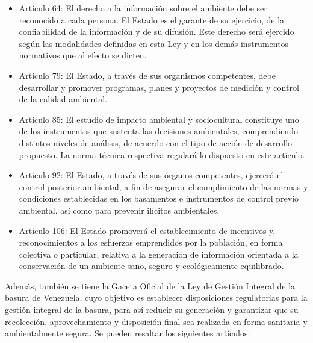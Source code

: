 \begin{itemize}
    \item Artículo 64: El derecho a la información sobre el ambiente debe ser reconocido a cada persona. El Estado es el garante de su ejercicio, de la confiabilidad de la información y de su difusión. Este derecho será ejercido según las modalidades definidas en esta Ley y en los demás instrumentos normativos que al efecto se dicten.
    
    \item Artículo 79: El Estado, a través de sus organismos competentes, debe desarrollar y promover programas, planes y proyectos de medición y control de la calidad ambiental.

    \item Artículo 85: El estudio de impacto ambiental y sociocultural constituye uno de los instrumentos que sustenta las decisiones ambientales, comprendiendo distintos niveles de análisis, de acuerdo con el tipo de acción de desarrollo propuesto. La norma técnica respectiva regulará lo dispuesto en este artículo.

    \item Artículo 92: El Estado, a través de sus órganos competentes, ejercerá el control posterior ambiental, a fin de asegurar el cumplimiento de las normas y condiciones establecidas en los basamentos e instrumentos de control previo ambiental, así como para prevenir ilícitos ambientales.

    \item Artículo 106: El Estado promoverá el establecimiento de incentivos y, reconocimientos a los esfuerzos emprendidos por la población, en forma colectiva o particular, relativa a la generación de información orientada a la conservación de un ambiente sano, seguro y ecológicamente equilibrado.
\end{itemize}

Además, también se tiene la Gaceta Oficial de la Ley de Gestión Integral de la basura de Venezuela, cuyo objetivo es establecer disposiciones regulatorias para la gestión integral de la basura, para así reducir su generación y garantizar que su recolección, aprovechamiento y disposición final sea realizada en forma sanitaria y ambientalmente segura. Se pueden resaltar los siguientes artículos:

